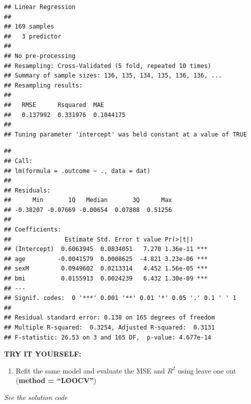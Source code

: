 \documentclass[
]{book}
\newenvironment{Shaded}{\begin{snugshade}}{\end{snugshade}}
\newcommand{\AttributeTok}[1]{\textcolor[rgb]{0.13,0.29,0.53}{#1}}
\newcommand{\CommentTok}[1]{\textcolor[rgb]{0.56,0.35,0.01}{\textit{#1}}}
\newcommand{\FunctionTok}[1]{\textcolor[rgb]{0.13,0.29,0.53}{\textbf{#1}}}
\newcommand{\NormalTok}[1]{#1}
\newcommand{\OtherTok}[1]{\textcolor[rgb]{0.56,0.35,0.01}{#1}}
\newcommand{\SpecialCharTok}[1]{\textcolor[rgb]{0.81,0.36,0.00}{\textbf{#1}}}
\newcommand{\StringTok}[1]{\textcolor[rgb]{0.31,0.60,0.02}{#1}}
\providecommand{\tightlist}{%
  \setlength{\itemsep}{0pt}\setlength{\parskip}{0pt}}
\begin{document}
\begin{verbatim}
## Linear Regression 
## 
## 169 samples
##   3 predictor
## 
## No pre-processing
## Resampling: Cross-Validated (5 fold, repeated 10 times) 
## Summary of sample sizes: 136, 135, 134, 135, 136, 136, ... 
## Resampling results:
## 
##   RMSE      Rsquared  MAE      
##   0.137992  0.331976  0.1044175
## 
## Tuning parameter 'intercept' was held constant at a value of TRUE
\end{verbatim}

\begin{Shaded}
\end{Shaded}

\begin{verbatim}
## 
## Call:
## lm(formula = .outcome ~ ., data = dat)
## 
## Residuals:
##      Min       1Q   Median       3Q      Max 
## -0.38207 -0.07669 -0.00654  0.07888  0.51256 
## 
## Coefficients:
##               Estimate Std. Error t value Pr(>|t|)    
## (Intercept)  0.6063945  0.0834051   7.270 1.36e-11 ***
## age         -0.0041579  0.0008625  -4.821 3.23e-06 ***
## sexM         0.0949602  0.0213314   4.452 1.56e-05 ***
## bmi          0.0155913  0.0024239   6.432 1.30e-09 ***
## ---
## Signif. codes:  0 '***' 0.001 '**' 0.01 '*' 0.05 '.' 0.1 ' ' 1
## 
## Residual standard error: 0.138 on 165 degrees of freedom
## Multiple R-squared:  0.3254, Adjusted R-squared:  0.3131 
## F-statistic: 26.53 on 3 and 165 DF,  p-value: 4.677e-14
\end{verbatim}

\textbf{TRY IT YOURSELF:}

\begin{enumerate}
\def\labelenumi{\arabic{enumi})}
\tightlist
\item
  Refit the same model and evaluate the MSE and \(R^2\) using leave one out (\textbf{method = ``LOOCV''})
\end{enumerate}

\emph{See the solution code}

\begin{Shaded}
\end{Shaded}
\end{document}
